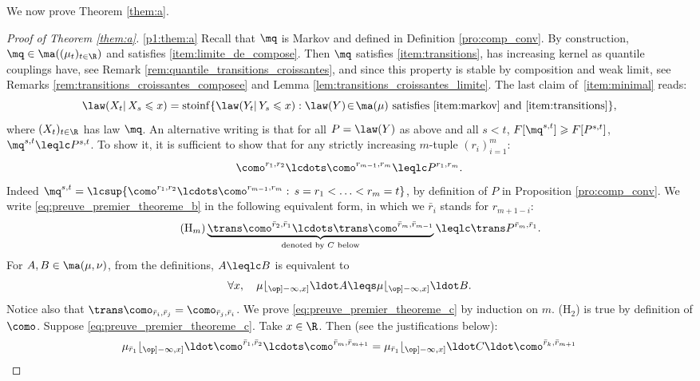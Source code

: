 We now prove Theorem \ref{them:a}.

\skpt
\begin{proof}[Proof of Theorem \ref{them:a}]

\eqref{p1:them:a}
Recall that $\mq$ is Markov and defined in Definition \ref{pro:comp_conv}. By construction, $\mq\in\ma((\mu_t)_{t\in\R})$ and satisfies \eqref{item:limite_de_compose}. Then $\mq$ satisfies \eqref{item:transitions}, \ie has increasing kernel as quantile couplings have, see Remark \ref{rem:quantile_transitions_croissantes}, and since this property is stable by composition and weak limit, see Remarks \ref{rem:transitions_croissantes_composee} and Lemma \ref{lem:transitions_croissantes_limite}. The last claim of~\eqref{item:minimal} reads:
\[
\law(X_{t}|\,X_{s}\leqslant x)
=\mathrm{stoinf}\{\law(Y_{t}|\,Y_{s}\leqslant x):\law(Y)\!\in\!\ma(\mu)\ \text{satisfies \eqref{item:markov} and \eqref{item:transitions}}\},
\]
where $(X_t)_{t\in \R}$ has law $\mq$. An alternative writing is that for all $P=\law(Y)$ as above and all $s<t$, $F[\mq^{s,t}]\geqslant F[P^{s,t}]$, \ie $\mq^{s,t}\leqlc P^{s,t}$. To show it, it is sufficient to show that for any strictly increasing $m$-tuple $(r_i)_{i=1}^m$:
\begin{equation}\label{eq:preuve_premier_theoreme_b}
\como^{r_1,r_2}\lcdots \como^{r_{m-1},r_m}\leqlc P^{r_1,r_m}.
\end{equation}
Indeed $\mq^{s,t}=\lcsup \{\como^{r_1,r_2}\lcdots \como^{r_{m-1},r_m}:\,s= r_1<\ldots<r_m= t\}$, by definition of $P$ in Proposition \ref{pro:comp_conv}.
We write \eqref{eq:preuve_premier_theoreme_b} in the following equivalent form, in which we $\bar r_i$ stands for $r_{m+1-i}$:
\begin{equation}\tag{H$_m$}\label{eq:preuve_premier_theoreme_c}
\underbrace{\trans\como^{\bar r_2,\bar r_1}\lcdots \trans\como^{\bar r_{m},\bar r_{m-1}}}_{\text{denoted by $C$ below}}\leqlc \trans P^{\bar r_m,\bar r_1}.
\end{equation}
For $A,B\in\ma(\mu,\nu)$, from the definitions, $A\leqlc B$ is equivalent to
\[
\forall x,\quad\mu\lfloor_{\op]-\infty,x]}\ldot A\leqs\mu\lfloor_{\op]-\infty,x]}\ldot B.
\]
Notice also that $\trans\como_{\bar r_i,\bar r_j}=\como_{\bar r_j,\bar r_i}$. We prove \eqref{eq:preuve_premier_theoreme_c} by induction on $m$. (H$_2$) is true by definition of $\como$. Suppose \eqref{eq:preuve_premier_theoreme_c}. Take $x\in\R$. Then (see the justifications below):
\begin{align}
\mu_{\bar r_1}\lfloor_{\op]-\infty,x]}{}\ldot\como^{\bar r_1,\bar r_2}\lcdots \como^{\bar r_{m},\bar r_{m+1}}&=\mu_{\bar r_1}\lfloor_{\op]-\infty,x]}\ldot C\ldot\como^{\bar r_{k},\bar r_{m+1}}\nonumber\\

\end{align}
\end{proof}
